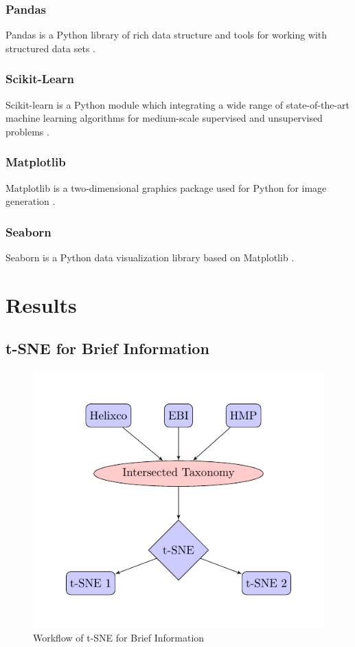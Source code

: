 \documentclass[a4paper]{article}
\begin{document}
            \subsubsection{Pandas}
                Pandas is a Python library of rich data structure and tools for working with structured data sets \cite{pandas1}.

            \subsubsection{Scikit-Learn}
                Scikit-learn is a Python module which integrating a wide range of state-of-the-art machine learning algorithms for medium-scale supervised and unsupervised problems \cite{sklearn1}.

            \subsubsection{Matplotlib}
                Matplotlib is a two-dimensional graphics package used for Python for image generation \cite{matplotlib1}.

            \subsubsection{Seaborn}
                Seaborn is a Python data visualization library based on Matplotlib \cite{seaborn1}.

    \section{Results}
        \subsection{t-SNE for Brief Information}

            \begin{figure}[p]
                \centering
                \includegraphics[width=0.3 \linewidth]{figures/tikz/brief.pdf}
                \caption{Workflow of t-SNE for Brief Information}
            \end{figure}
\end{document}
